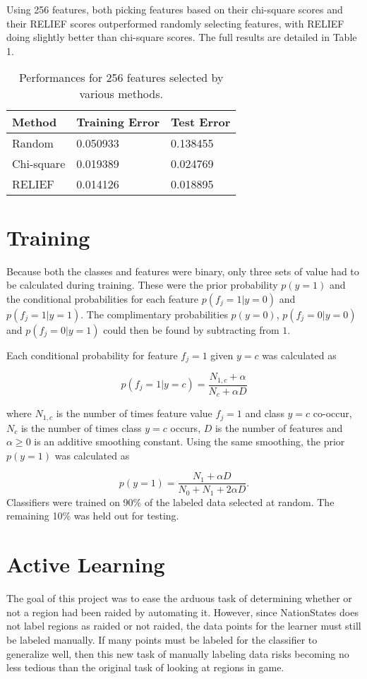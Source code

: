 \documentclass[12pt]{article}
\begin{document}
Using 256 features, both picking features based on their chi-square scores and their RELIEF scores outperformed randomly selecting features, with RELIEF doing slightly better than chi-square scores. The full results are detailed in Table 1.

\begin{table*}\centering
	\renewcommand{\arraystretch}{1.3}
		\begin{tabular}{@{}m{4cm}m{4cm}m{4cm}@{}}
			\toprule
			\textbf{Method} & \textbf{Training Error} & \textbf{Test Error} \\
			\midrule
			Random & 0.050933 & 0.138455 \\
			Chi-square & 0.019389 & 0.024769 \\
			RELIEF & 0.014126 & 0.018895 \\
			\bottomrule
		\end{tabular}
	\caption{Performances for 256 features selected by various methods.}
\end{table*}

\section{Training}
Because both the classes and features were binary, only three sets of value had to be calculated during training. These were the prior probability $p(y=1)$ and the conditional probabilities for each feature $p(f_j=1 \vert y=0)$ and $p(f_j=1 \vert y=1)$. The complimentary probabilities $p(y=0)$, $p(f_j=0 \vert y=0)$ and $p(f_j=0 \vert y=1)$ could then be found by subtracting from $1$.

Each conditional probability for feature $f_j=1$ given $y=c$ was calculated as

\[
	p(f_j=1 \vert y=c) = \frac{N_{1,c}+\alpha}{N_{c}+\alpha D}
\]

\noindent where $N_{1,c}$ is the number of times feature value $f_j=1$ and class $y=c$ co-occur, $N_{c}$ is the number of times class $y=c$ occurs, $D$ is the number of features and $\alpha \geq 0$ is an additive smoothing constant. Using the same smoothing, the prior $p(y=1)$ was calculated as

\[
	p(y=1) = \frac{N_1+\alpha D}{N_0 + N_1 + 2 \alpha D}.
\]
Classifiers were trained on 90\% of the labeled data selected at random. The remaining 10\% was held out for testing.

\section{Active Learning}
The goal of this project was to ease the arduous task of determining whether or not a region had been raided by automating it. However, since NationStates does not label regions as raided or not raided, the data points for the learner must still be labeled manually. If many points must be labeled for the classifier to generalize well, then this new task of manually labeling data risks becoming no less tedious than the original task of looking at regions in game.
\end{document}
